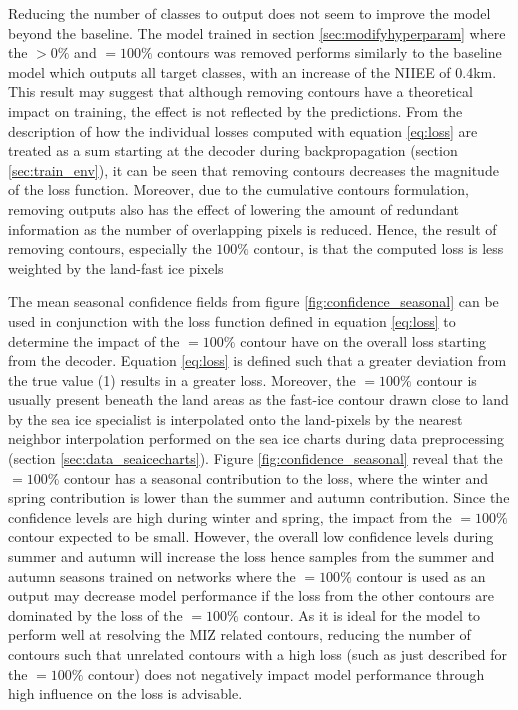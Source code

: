 \documentclass[../main/thesis]{subfiles}
\begin{document}
Reducing the number of classes to output does not seem to improve the model beyond the baseline. The model trained in section \ref{sec:modifyhyperparam} where the $> 0\%$ and $=100\%$ contours was removed performs similarly to the baseline model which outputs all target classes, with an increase of the NIIEE of 0.4km. This result may suggest that although removing contours have a theoretical impact on training, the effect is not reflected by the predictions. From the description of how the individual losses computed with equation \ref{eq:loss} are treated as a sum starting at the decoder during backpropagation (section \ref{sec:train_env}), it can be seen that removing contours decreases the magnitude of the loss function. Moreover, due to the cumulative contours formulation, removing outputs also has the effect of lowering the amount of redundant information as the number of overlapping pixels is reduced. Hence, the result of removing contours, especially the $100\%$ contour, is that the computed loss is less weighted by the land-fast ice pixels %

The mean seasonal confidence fields from figure \ref{fig:confidence_seasonal} can be used in conjunction with the loss function defined in equation \ref{eq:loss} to determine the impact of the $=100\%$ contour have on the overall loss starting from the decoder. Equation \ref{eq:loss} is defined such that a greater deviation from the true value (1) results in a greater loss. Moreover, the $=100\%$ contour is usually present beneath the land areas as the fast-ice contour drawn close to land by the sea ice specialist is interpolated onto the land-pixels by the nearest neighbor interpolation \citep{Wang2017} performed on the sea ice charts during data preprocessing (section \ref{sec:data_seaicecharts}). Figure \ref{fig:confidence_seasonal} reveal that the $=100\%$ contour has a seasonal contribution to the loss, where the winter and spring contribution is lower than the summer and autumn contribution. Since the confidence levels are high during winter and spring, the impact from the $=100\%$ contour expected to be small. However, the overall low confidence levels during summer and autumn will increase the loss hence samples from the summer and autumn seasons trained on networks where the $=100\%$ contour is used as an output may decrease model performance if the loss from the other contours are dominated by the loss of the $=100\%$ contour. As it is ideal for the model to perform well at resolving the MIZ related contours, reducing the number of contours such that unrelated contours with a high loss (such as just described for the $=100\%$ contour) does not negatively impact model performance through high influence on the loss is advisable.
\end{document}
